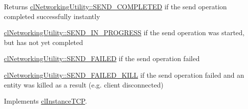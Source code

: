 \begin{DoxyReturn}{Returns}
\hyperlink{classcl_networking_utility_a19389cda12603396e03caa9d82073803abaa42412f2920363cef741fd5b2e202a}{clNetworkingUtility::SEND\_\-COMPLETED} if the send operation completed successfully instantly 

\hyperlink{classcl_networking_utility_a19389cda12603396e03caa9d82073803a807b2f9dcc901c6012549316bccfe407}{clNetworkingUtility::SEND\_\-IN\_\-PROGRESS} if the send operation was started, but has not yet completed 

\hyperlink{classcl_networking_utility_a19389cda12603396e03caa9d82073803a583b1181229130ff739548c8f8de363c}{clNetworkingUtility::SEND\_\-FAILED} if the send operation failed 

\hyperlink{classcl_networking_utility_a19389cda12603396e03caa9d82073803ab06ce588df19988e79b503398b720c79}{clNetworkingUtility::SEND\_\-FAILED\_\-KILL} if the send operation failed and an entity was killed as a result (e.g. client disconnected) 
\end{DoxyReturn}


Implements \hyperlink{classcl_instance_t_c_p_a155def07aa6e36251e3d629111a70bc4}{clInstanceTCP}.

